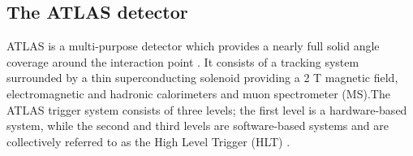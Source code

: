 \documentclass[11pt]{article}
\begin{document}
\subsection*{The ATLAS detector}
\begin{flushleft}
ATLAS is a multi-purpose detector which provides a nearly full solid angle coverage around the interaction point \cite{carquin2015search}. It consists of a tracking system surrounded by a thin superconducting solenoid providing a 2 T magnetic field, electromagnetic and hadronic calorimeters and muon spectrometer (MS).The ATLAS trigger system consists of three levels; the first level is a hardware-based system, while the second and third levels are software-based systems and are collectively referred to as the High Level Trigger (HLT) \cite{carquin2015search}.
\end{flushleft}
\end{document}
